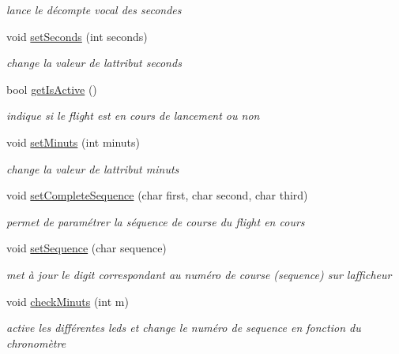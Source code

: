 \begin{DoxyCompactItemize}
\begin{DoxyCompactList}\small\item\em lance le décompte vocal des secondes \end{DoxyCompactList}\item 
void \hyperlink{class_flight_ad26c2a5811f5cebb5955946bb6f93cca}{set\+Seconds} (int seconds)
\begin{DoxyCompactList}\small\item\em change la valeur de l\textquotesingle{}attribut seconds \end{DoxyCompactList}\item 
bool \hyperlink{class_flight_a905f20ea23734db3fe6c8d51b6e81bfe}{get\+Is\+Active} ()
\begin{DoxyCompactList}\small\item\em indique si le flight est en cours de lancement ou non \end{DoxyCompactList}\item 
void \hyperlink{class_flight_a783bdc8737b1f4d8f6cb412a361c4bec}{set\+Minuts} (int minuts)
\begin{DoxyCompactList}\small\item\em change la valeur de l\textquotesingle{}attribut minuts \end{DoxyCompactList}\item 
void \hyperlink{class_flight_ad7679d1041b3a96ba1f0d1a0a25400dc}{set\+Complete\+Sequence} (char first, char second, char third)
\begin{DoxyCompactList}\small\item\em permet de paramétrer la séquence de course du flight en cours \end{DoxyCompactList}\item 
void \hyperlink{class_flight_a98d53d3ca75b71660f74a178df75bd3f}{set\+Sequence} (char sequence)
\begin{DoxyCompactList}\small\item\em met à jour le digit correspondant au numéro de course (sequence) sur l\textquotesingle{}afficheur \end{DoxyCompactList}\item 
void \hyperlink{class_flight_abbbb8270b5c7706608a321ccb927f5a4}{check\+Minuts} (int m)
\begin{DoxyCompactList}\small\item\em active les différentes leds et change le numéro de sequence en fonction du chronomètre \end{DoxyCompactList}\item 

\end{DoxyCompactItemize}
